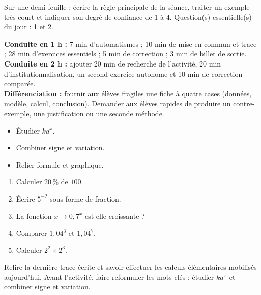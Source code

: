 \begin{sortie}Sur une demi-feuille : écrire la règle principale de la séance, traiter un exemple très court et indiquer son degré de confiance de 1 à 4. Question(s) essentielle(s) du jour : 1 et 2.\end{sortie}

\ifprof
\begin{methode}
\textbf{Conduite en 1 h :} 7 min d'automatismes ; 10 min de mise en commun et trace ; 28 min d'exercices essentiels ; 5 min de correction ; 3 min de billet de sortie.\\
\textbf{Conduite en 2 h :} ajouter 20 min de recherche de l'activité, 20 min d'institutionnalisation, un second exercice autonome et 10 min de correction comparée.\\
\textbf{Différenciation :} fournir aux élèves fragiles une fiche à quatre cases (données, modèle, calcul, conclusion). Demander aux élèves rapides de produire un contre-exemple, une justification ou une seconde méthode.
\end{methode}
\fi
{}
\begin{objectifs}\begin{itemize}\item Étudier $ka^x$.\item Combiner signe et variation.\item Relier formule et graphique.\end{itemize}\end{objectifs}
\begin{automatismes}\begin{enumerate}\item Calculer $20\,\%$ de $100$. \item Écrire $5^{-2}$ sous forme de fraction. \item La fonction $x\mapsto0{,}7^x$ est-elle croissante ? \item Comparer $1{,}04^3$ et $1{,}04^7$. \item Calculer $2^2\times2^3$. \end{enumerate}\end{automatismes}
\begin{prerequis}Relire la dernière trace écrite et savoir effectuer les calculs élémentaires mobilisés aujourd'hui. Avant l'activité, faire reformuler les mots-clés : étudier $ka^x$ et combiner signe et variation.\end{prerequis}

